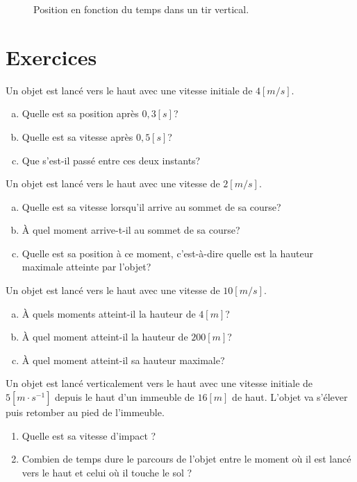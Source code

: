\begin{figure}[h!]
  \centering
  
  \caption{Position en fonction du temps dans un tir vertical.}
  \label{position_tir_vertical}
\end{figure}

\newpage

\section{Exercices}
\begin{exercise}
  Un objet est lancé vers le haut avec une vitesse initiale de \(4[m/s]\).
  \begin{enumerate}[a)]
    \item Quelle est sa position après \(0,3[s]\)?
    \item Quelle est sa vitesse après \(0,5[s]\)?
    \item Que s'est-il passé entre ces deux instants?
  \end{enumerate}
\end{exercise}

\begin{exercise}
  Un objet est lancé vers le haut avec une vitesse de \(2[m/s]\).
  \begin{enumerate}[a)]
    \item Quelle est sa vitesse lorsqu'il arrive au sommet de sa course?
    \item À quel moment arrive-t-il au sommet de sa course?
    \item Quelle est sa position à ce moment, c'est-à-dire quelle est la hauteur maximale atteinte par l'objet?
  \end{enumerate}
\end{exercise}

\begin{exercise}
  Un objet est lancé vers le haut avec une vitesse de \(10 [m/s]\).
  \begin{enumerate}[a)]
    \item À quels moments atteint-il la hauteur de \(4[m]\)?
    \item À quel moment atteint-il la hauteur de \(200[m]\)?
    \item À quel moment atteint-il sa hauteur maximale?
  \end{enumerate}
\end{exercise}

\begin{exercise}
  Un objet est lancé verticalement vers le haut avec une vitesse initiale de \(5[m \cdot s^{-1}]\) depuis le haut d'un immeuble de \(16[m]\) de haut. L'objet va s'élever puis retomber au pied de l'immeuble.
  \begin{enumerate}[label=\alph*)]
    \item        Quelle est sa vitesse d'impact ?
    \item       Combien de temps dure le parcours de l'objet entre le moment où il est lancé vers le haut et celui où il touche le sol ?
  \end{enumerate}
\end{exercise}

